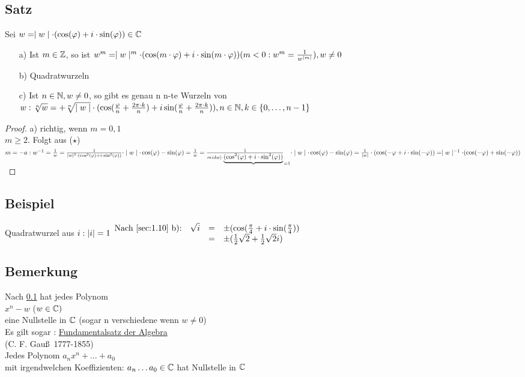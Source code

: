\subsection[Satz: Komplexe Wurzeln]{Satz}\label{sec:1.10}
Sei $w = \mid w \mid \cdot ( \cos(\varphi) + i \cdot \sin(\varphi)) \in \mathbb{C}$\\
\begin{enumerate}
\item[a)] Ist $m \in \mathbb{Z}$, so ist $w^m = \mid w \mid^m \cdot ( \cos(m \cdot \varphi) + i \cdot \sin(m \cdot \varphi))\\
( m < 0 : w^m = \frac{1}{w^{\mid m \mid}}), w \not = 0$\\
\item[b)] Quadratwurzeln
\item[c)] Ist $n \in \mathbb{N}, w \not = 0$, so gibt es genau n n-te Wurzeln von $w:\\
\sqrt[n]{w} = + \sqrt[n]{\mid w \mid} \cdot (\cos(\frac{\varphi}{n} + \frac{2\pi \cdot k}{n}) + i \sin(\frac{\varphi}{n}+ \frac{2\pi \cdot k}{n})), n \in \mathbb{N}  ,k \in \{0, \ldots,n-1\}$
\end{enumerate}
\begin{proof}
a) richtig, wenn $m=0,1$\\
$m \geq 2.$ Folgt aus ($\star$)\\
$m=-a:\\
w^{-1} = \frac{1}{w} = \frac{1}{\mid w \mid^2 \cdot ( \cos^2(\varphi) + i \cdot \sin^2( \varphi))} \cdot \mid w \mid \cdot \cos(\varphi) - \sin(\varphi)\\
= \frac{1}{w} = \frac{1}{mid w \mid \cdot \underbrace{( \cos^2(\varphi) + i \cdot \sin^2( \varphi))}}_{=1} \cdot \mid w \mid \cdot \cos(\varphi) - \sin(\varphi)\\
= \frac{1}{\mid w \mid } \cdot (\cos(-\varphi + i \cdot \sin(-\varphi)) = \mid w \mid^{-1} \cdot (\cos(-\varphi) + \sin(-\varphi))$\\
\end{proof}
\subsection{Beispiel}
Quadratwurzel aus $i:\\
\lvert i \rvert =1\\
\begin{array}{llcl}
\text{Nach \ref{sec:1.10} b):} &\sqrt{i}&=& \pm (\cos(\frac{\pi}{4} + i \cdot \sin(\frac{\pi}{4}))\\
& &=& \pm (\frac{1}{2}\sqrt{2} + \frac{1}{2}\sqrt{2}i)
\end{array}
$
\subsection{Bemerkung}
Nach \ref{sec:1.10} hat jedes Polynom\\
$ x^{n} -w$ ($w \in \mathbb{C})$\\
eine Nullstelle in $\mathbb{C}$ (sogar n verschiedene wenn $w \not = 0$)\\
Es gilt sogar : \underline{Fundamentalsatz der Algebra}\\
\hfill (C. F. Gau\ss\ 1777-1855)\\
Jedes Polynom $a_n x^n + \ldots + a_0$\\
mit irgendwelchen Koeffizienten: $a_n \ldots a_0 \in \mathbb{C}$ hat Nullstelle in $\mathbb{C}$
